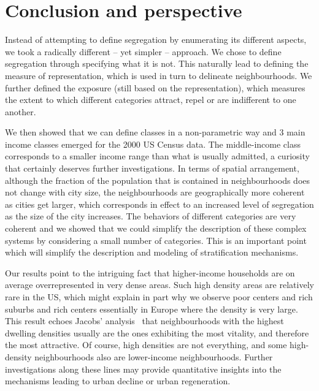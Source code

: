 \section{Conclusion and perspective}
\label{sec:conclusion_and_perspective}

Instead of attempting to define segregation by enumerating its different
aspects, we took a radically different -- yet simpler -- approach. We chose to
define segregation through specifying what it is not.  This naturally lead to
defining the measure of representation, which is used in turn to delineate
neighbourhoods. We further defined the exposure (still based on the
representation), which measures the extent to which different categories
attract, repel or are indifferent to one another.

We then showed that we can define classes in a non-parametric way and 3 main
income classes emerged for the 2000 US Census data. The middle-income class
corresponds to a smaller income range than what is usually admitted, a curiosity
that certainly deserves further investigations. In terms of spatial arrangement,
although the fraction of the population that is contained in neighbourhoods does
not change with city size, the neighbourhoods are geographically more coherent
as cities get larger, which corresponds in effect to an increased level of
segregation as the size of the city increases. The behaviors of different
categories are very coherent and we showed that we could simplify the
description of these complex systems by considering a small number of
categories. This is an important point which will simplify the description and
modeling of stratification mechanisms.

Our results point to the intriguing fact that higher-income households are on
average overrepresented in very dense areas. Such high density areas are
relatively rare in the US, which might explain in part why we observe poor
centers and rich suburbs and rich centers essentially in Europe where the
density is very large. This result echoes Jacobs' analysis~\cite{Jacobs:1961}
that neighbourhoods with the highest dwelling densities usually are the ones
exhibiting the most vitality, and therefore the most attractive. Of course, high
densities are not everything, and some high-density neighbourhoods also are
lower-income neighbourhoods. Further investigations along these lines may
provide quantitative insights into the mechanisms leading to urban decline or
urban regeneration.\\

